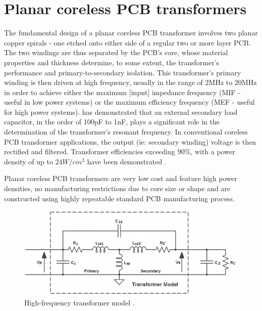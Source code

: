 \documentclass[conference]{IEEEtran}
\begin{document}
\section{Planar coreless PCB transformers}

The fundamental design of a planar coreless PCB transformer involves two planar copper spirals - one etched onto either side of a regular two or more layer PCB.  The two windings are thus separated by the PCB's core, whose material properties and thickness determine, to some extent, the transformer's performance and primary-to-secondary isolation.  This transformer's primary winding is then driven at high frequency, usually in the range of 2MHz to 20MHz in order to achieve either the maximum [input] impedance frequency (MIF - useful in low power systems) or the maximum efficiency frequency (MEF - useful for high power systems)\cite{TangHuiFundamental}\cite{NaturallySoft}\cite{OptimalOperation}\cite{CorelessGateDrive}.  \cite{TangHuiFundamental} has demonstrated that an external secondary load capacitor, in the order of 100pF to 1nF, plays a significant role in the determination of the transformer's resonant frequency.  In conventional coreless PCB transformer applications, the output (ie: secondary winding) voltage is then rectified and filtered.  Transformer efficiencies exceeding 90\%, with a power density of up to $ 24W/cm^{2} $ have been demonstrated \cite{TangHuiFundamental}.

Planar coreless PCB transformers are very low cost and feature high power densities, no manufacturing restrictions due to core size or shape and are constructed using highly repeatable standard PCB manufacturing process. 

\begin{figure}[t]
	\centering
	\includegraphics[width=1\columnwidth]{./img/HF_Model}
	\caption{High-frequency transformer model \cite{TangHuiFundamental}.}
	\label{fig:HF-Model}
\end{figure}
\end{document}
